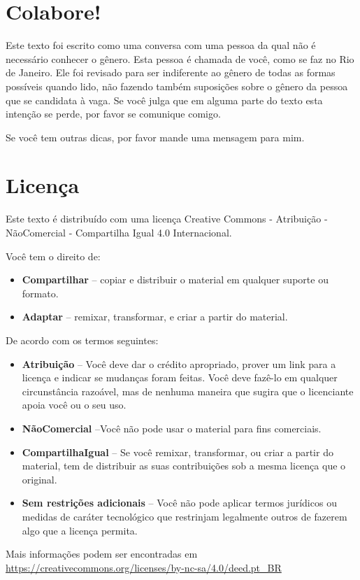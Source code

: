 \documentclass{article}
\begin{document}
\section{Colabore!}

Este texto foi escrito como uma conversa com uma pessoa da qual não é necessário conhecer o gênero. Esta pessoa é chamada de você, como se faz no Rio de Janeiro. Ele foi revisado para ser indiferente ao gênero de todas as formas possíveis quando lido, não fazendo também suposições sobre o gênero da pessoa que se candidata à vaga. Se você julga que em alguma parte do texto esta intenção se perde, por favor se comunique comigo.

Se você tem outras dicas, por favor mande uma mensagem para mim.



\section{Licença}

Este texto é distribuído com uma licença Creative Commons - Atribuição - NãoComercial - Compartilha Igual 4.0 Internacional.


Você tem o direito de:
\begin{itemize}
\item \textbf{Compartilhar} -- copiar e distribuir o material em qualquer suporte ou formato.
\item \textbf{Adaptar} -- remixar, transformar, e criar a partir do material.
\end{itemize}

De acordo com os termos seguintes:
\begin{itemize}
\item \textbf{Atribuição} -- Você deve dar o crédito apropriado, prover um link para a licença e indicar se mudanças foram feitas. Você deve fazê-lo em qualquer circunstância razoável, mas de nenhuma maneira que sugira que o licenciante apoia você ou o seu uso.
\item \textbf{NãoComercial} --Você não pode usar o material para fins comerciais.
\item \textbf{CompartilhaIgual} -- Se você remixar, transformar, ou criar a partir do material, tem de distribuir as suas contribuições sob a mesma licença que o original.
\item \textbf{Sem restrições adicionais} -- Você não pode aplicar termos jurídicos ou medidas de caráter tecnológico que restrinjam legalmente outros de fazerem algo que a licença permita.
\end{itemize}

Mais informações podem ser encontradas em \url{https://creativecommons.org/licenses/by-nc-sa/4.0/deed.pt_BR}
\end{document}
